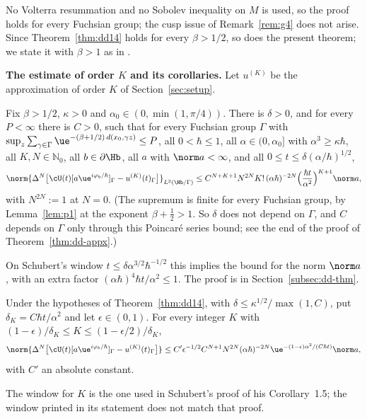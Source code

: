 \begin{remark}
No Volterra resummation and no Sobolev inequality on $M$ is used, so the proof holds for every Fuchsian
group; the cusp issue of Remark~\ref{rem:g4} does not arise. Since Theorem~\ref{thm:dd14} holds for every $\beta>1/2$, so does
the present theorem; we state it with $\beta>1$ as in \cite{S}.
\end{remark}

\medskip\noindent\textbf{The estimate of order $K$ and its corollaries.}
Let $u^{(K)}$ be the approximation of order $K$ of Section~\ref{sec:setup}.
\begin{theoremR}\label{thm:dd14}
Fix $\beta>1/2$, $\kappa>0$ and $\alpha_0\in(0,\min(1,\pi/4))$. There is $\delta>0$, and for every $P<\infty$ there is $C>0$,
such that for every Fuchsian group $\Gamma$ with $\sup_z\sum_{\gamma\in\Gamma}\ue^{-(\beta+1/2)\,d(x_0,\gamma z)}\le P$, all $0<\hbar\le1$, all $\alpha\in(0,\alpha_0]$ with $\alpha^3\ge\kappa\hbar$, all $K,N\in\mathbb N_0$, all $b\in\partial\Hb$, all $a$
with $\norm a<\infty$, and all $0\le t\le\delta(\alpha/\hbar)^{1/2}$,
\[
\norm{\Delta^N\big[\cU(t)[a\ue^{i\varphi_b/\hbar}]_\Gamma-u^{(K)}(t)_\Gamma\big]}_{L^2(\Hb/\Gamma)}
\le C^{N+K+1}N^{2N}K!\,(\alpha\hbar)^{-2N}\Big(\frac{\hbar t}{\alpha^2}\Big)^{K+1}\norm a ,
\]
with $N^{2N}:=1$ at $N=0$.
(The supremum is finite for every Fuchsian group, by Lemma~\ref{lem:p1} at the exponent $\beta+\tfrac12>1$. So $\delta$ does not
depend on $\Gamma$, and $C$ depends on $\Gamma$ only through this Poincar\'e series bound; see the end of the proof of
Theorem~\ref{thm:dd-appx}.)
\end{theoremR}
On Schubert's window $t\le\delta\alpha^{3/2}\hbar^{-1/2}$ this implies the bound \cite[(1.30)]{S} for the norm $\norm a$,
with an extra factor $(\alpha\hbar)^4\hbar t/\alpha^2\le1$. The proof is in Section~\ref{subsec:dd-thm}.

\begin{corollaryR}\label{cor:dd15}
Under the hypotheses of Theorem~\ref{thm:dd14}, with $\delta\le\kappa^{1/2}/\max(1,C)$, put $\delta_K=C\hbar t/\alpha^2$ and let $\epsilon\in(0,1)$. For every integer $K$ with
$(1-\epsilon)/\delta_K\le K\le(1-\epsilon/2)/\delta_K$,
\[
\norm{\Delta^N\big[\cU(t)[a\ue^{i\varphi_b/\hbar}]_\Gamma-u^{(K)}(t)_\Gamma\big]}\le C'\epsilon^{-1/2}C^{N+1}N^{2N}(\alpha\hbar)^{-2N}\ue^{-(1-\epsilon)\alpha^2/(C\hbar t)}\norm a ,
\]
with $C'$ an absolute constant.
\end{corollaryR}
The window for $K$ is the one used in Schubert's proof of his Corollary~1.5; the window printed in its statement
does not match that proof.

